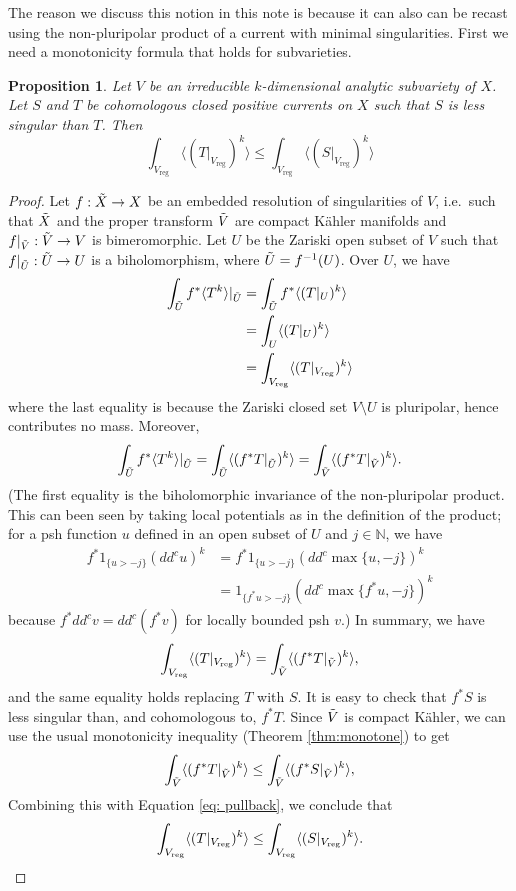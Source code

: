 \documentclass[a4paper]{amsart}
\newcommand{\N}{\mathbb{N}}
\newcommand{\reg}{{\operatorname{reg}}}
\newcommand{\inv}{^{-1}}
\newtheorem{prop}[theorem]{Proposition}
\theoremstyle{definition}
\begin{document}
The reason we discuss this notion in this note is because it can also can be recast using the non-pluripolar product of a current with minimal singularities. First we need a monotonicity formula that holds for subvarieties. 
\begin{prop}\label{prop: r monotone}
    Let $V$ be an irreducible $k$-dimensional analytic subvariety of $X$. Let $S$ and $T$ be cohomologous closed positive currents on $X$ such that $S$ is less singular than $T$. Then 
    \[\int_{V_\reg} \langle(T|_{V_\reg})^k\rangle \le \int_{V_\reg} \langle(S|_{V_\reg})^k\rangle\]
\end{prop}
\begin{proof}
    Let $f: \Tilde{X} \to X$ be an embedded resolution of singularities of $V$, i.e.\ such that $\Tilde{X}$ and the proper transform $\Tilde{V}$ are compact K\"ahler manifolds and $f|_{\Tilde{V}}: \Tilde{V} \to V$ is bimeromorphic. Let $U$ be the Zariski open subset of $V$ such that $f|_{\Tilde{U}}: \Tilde{U} \to U$ is a biholomorphism, where $\Tilde{U} = f\inv(U)$. Over $U$, we have
    \begin{align*}
        \int_{\Tilde{U}} f^*\langle T^k\rangle|_{\Tilde{U}} &= \int_{\Tilde{U}} f^*\langle (T|_U)^k\rangle\\
        &= \int_U\langle (T|_U)^k\rangle\\
        &= \int_{V_\reg}\langle (T|_{V_\reg})^k\rangle
    \end{align*} 
    where the last equality is because the Zariski closed set $V\setminus U$ is pluripolar, hence contributes no mass. Moreover,
       \[\int_{\Tilde{U}} f^*\langle T^k\rangle|_{\Tilde{U}}  = \int_{\Tilde{U}}\langle (f^*T|_{\Tilde{U}})^k\rangle = \int_{\Tilde{V}}\langle (f^*T|_{\Tilde{V}})^k\rangle.\]
       (The first equality is the biholomorphic invariance of the non-pluripolar product. This can been seen by taking local potentials as in the definition of the product; for a psh function $u$ defined in an open subset of $U$ and $j\in \N$, we have
       \begin{align*}
           f^*1_{\{u > -j\}}(dd^cu)^k &= f^*1_{\{u > -j\}} (dd^c\max\{u, -j\})^k\\ &= 1_{\{f^*u > -j\}}(dd^c\max\{f^*u, -j\})^k
       \end{align*}
       because $f^*dd^cv = dd^c(f^*v)$ for locally bounded psh $v$.)
       In summary, we have
    \begin{equation}\label{eq: pullback}
        \int_{V_\reg}\langle (T|_{V_\reg})^k\rangle = \int_{\Tilde{V}}\langle (f^*T|_{\Tilde{V}})^k\rangle,
    \end{equation}
    and the same equality holds replacing $T$ with $S$. It is easy to check that $f^*S$ is less singular than, and cohomologous to, $f^*T$. Since $\Tilde{V}$ is compact K\"ahler, we can use the usual monotonicity inequality (Theorem \ref{thm:monotone}) to get
    \[\int_{\Tilde{V}}\langle (f^* T|_{\Tilde{V}})^k\rangle \le \int_{\Tilde{V}}\langle (f^* S|_{\Tilde{V}})^k\rangle,\]
    Combining this with Equation \eqref{eq: pullback}, we conclude that
    \[\int_{V_\reg} \langle(T|_{V_\reg})^k\rangle \le \int_{V_\reg} \langle(S|_{V_\reg})^k\rangle.\qedhere\]
\end{proof}
\end{document}
